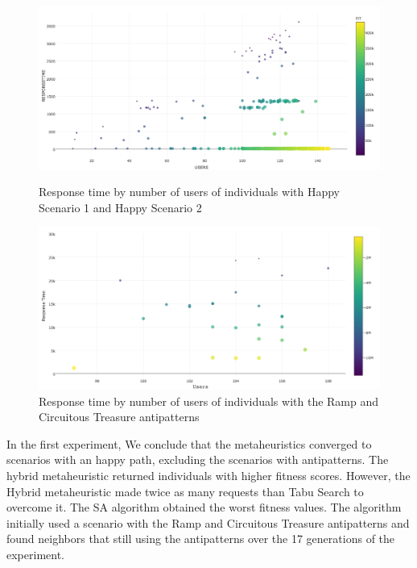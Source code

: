 \documentclass[times]{stvrauth}
\begin{document}
\begin{figure}[h]
\begin{minipage}{.5\textwidth}
\centering
\includegraphics[width=1\textwidth]{./images/experiment1-7.png}
\caption{Response time by number of users of individuals with Happy Scenario 1 and Happy Scenario 2}
\label{fig:responsetimegenerationalltests1}
\end{minipage}
\begin{minipage}{.5\textwidth}
\centering
\includegraphics[width=1\textwidth]{./images/experiment1-8.png}
\caption{Response time by number of users of individuals with the Ramp and Circuitous Treasure antipatterns}
\label{fig:fitnessgenerationalltests1-1}
\end{minipage}
\end{figure}

In the first experiment, We conclude that the metaheuristics converged to scenarios with an happy path, excluding the scenarios with antipatterns. The hybrid metaheuristic returned individuals with higher fitness scores. However, the Hybrid metaheuristic made twice as many requests than Tabu Search to overcome it. The SA algorithm obtained the worst fitness values. The algorithm initially used a scenario with the Ramp and Circuitous Treasure antipatterns  and found neighbors that still using the antipatterns over the 17 generations of the experiment.
\end{document}
